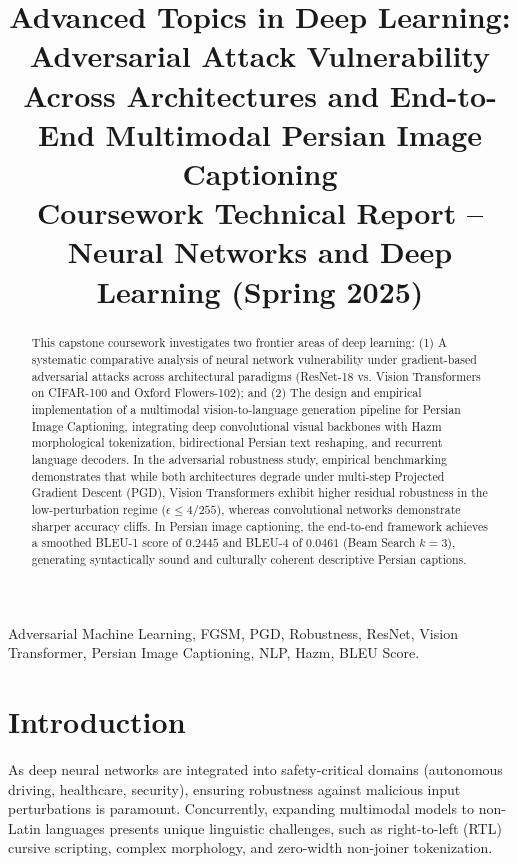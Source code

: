 \documentclass[conference]{IEEEtran}
\begin{document}
\title{Advanced Topics in Deep Learning: Adversarial Attack Vulnerability Across Architectures and End-to-End Multimodal Persian Image Captioning\\
\large Coursework Technical Report -- Neural Networks and Deep Learning (Spring 2025)}

\author{
}

\maketitle

\begin{abstract}
This capstone coursework investigates two frontier areas of deep learning: (1) A systematic comparative analysis of neural network vulnerability under gradient-based adversarial attacks across architectural paradigms (ResNet-18 vs. Vision Transformers on CIFAR-100 and Oxford Flowers-102); and (2) The design and empirical implementation of a multimodal vision-to-language generation pipeline for Persian Image Captioning, integrating deep convolutional visual backbones with Hazm morphological tokenization, bidirectional Persian text reshaping, and recurrent language decoders. In the adversarial robustness study, empirical benchmarking demonstrates that while both architectures degrade under multi-step Projected Gradient Descent (PGD), Vision Transformers exhibit higher residual robustness in the low-perturbation regime ($\epsilon \le 4/255$), whereas convolutional networks demonstrate sharper accuracy cliffs. In Persian image captioning, the end-to-end framework achieves a smoothed BLEU-1 score of $0.2445$ and BLEU-4 of $0.0461$ (Beam Search $k=3$), generating syntactically sound and culturally coherent descriptive Persian captions.
\end{abstract}

\begin{IEEEkeywords}
Adversarial Machine Learning, FGSM, PGD, Robustness, ResNet, Vision Transformer, Persian Image Captioning, NLP, Hazm, BLEU Score.
\end{IEEEkeywords}

\section{Introduction}
As deep neural networks are integrated into safety-critical domains (autonomous driving, healthcare, security), ensuring robustness against malicious input perturbations is paramount. Concurrently, expanding multimodal models to non-Latin languages presents unique linguistic challenges, such as right-to-left (RTL) cursive scripting, complex morphology, and zero-width non-joiner tokenization.
\end{document}
